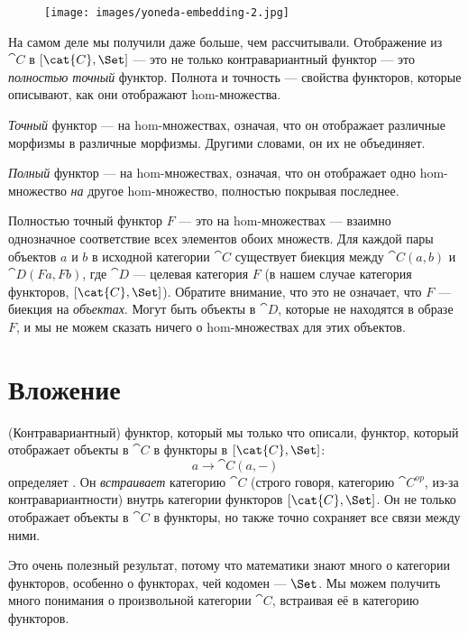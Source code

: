 \begin{figure}[H]
  \centering
  \texttt{[image: images/yoneda-embedding-2.jpg]}
\end{figure}

\noindent
На самом деле мы получили даже больше, чем рассчитывали. Отображение из
$\cat{C}$ в $[\cat{C}, \Set]$ --- это не только контравариантный функтор
--- это \emph{полностью точный} функтор. Полнота и точность ---
свойства функторов, которые описывают, как они отображают hom-множества.

\emph{Точный} функтор ---  на hom-множествах, означая, что
он отображает различные морфизмы в различные морфизмы. Другими словами, он
их не объединяет.

\emph{Полный} функтор ---  на hom-множествах, означая, что он
отображает одно hom-множество \emph{на} другое hom-множество, полностью покрывая
последнее.

Полностью точный функтор $F$ --- это  на hom-множествах
--- взаимно однозначное соответствие всех элементов обоих множеств. Для каждой пары
объектов $a$ и $b$ в исходной категории $\cat{C}$
существует биекция между $\cat{C}(a, b)$ и
$\cat{D}(F a, F b)$, где $\cat{D}$ --- целевая категория
$F$ (в нашем случае категория функторов, $[\cat{C}, \Set]$).
Обратите внимание, что это не означает, что $F$ --- биекция на
\emph{объектах}. Могут быть объекты в $\cat{D}$, которые не находятся в
образе $F$, и мы не можем сказать ничего о hom-множествах для этих
объектов.

\section{Вложение}

(Контравариантный) функтор, который мы только что описали, функтор, который
отображает объекты в $\cat{C}$ в функторы в $[\cat{C}, \Set]$:
\[a \to \cat{C}(a, -)\]
определяет . Он \emph{встраивает} категорию
$\cat{C}$ (строго говоря, категорию $\cat{C}^\mathit{op}$,
из-за контравариантности) внутрь категории функторов
$[\cat{C}, \Set]$. Он не только отображает объекты в $\cat{C}$ в
функторы, но также точно сохраняет все связи между ними.

Это очень полезный результат, потому что математики знают много о
категории функторов, особенно о функторах, чей кодомен ---
$\Set$. Мы можем получить много понимания о произвольной категории
$\cat{C}$, встраивая её в категорию функторов.

